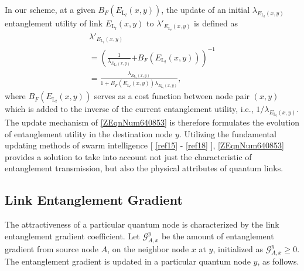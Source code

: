 \documentclass[11pt]{article}%
\newcommand*{\cref}[1]{%
  \begingroup
    \hypersetup{
      linkcolor=linkequation,
      linkbordercolor=linkequation,
    }%
    \ref{#1}%
  \endgroup
}
\begin{document}
 In our scheme, at a given $B_F\left(E_{{\mathrm{L}}_l}\left(x,y\right)\right)$, the update of an initial ${\lambda }_{E_{{\mathrm{L}}_l}\left(x,y\right)}$ entanglement utility of link $E_{{\mathrm{L}}_l}\left(x,y\right)$ to ${\lambda }'_{E_{{\mathrm{L}}_l}\left(x,y\right)}$ is defined as
\begin{equation} \label{ZEqnNum640853} 
 \begin{array}{l}
{\lambda }'_{E_{{\mathrm{L}}_l}\left(x,y\right)}\\\mathrm{=}{\left(\frac{\mathrm{1}}{{\lambda }_{E_{{\mathrm{L}}_l}\left(x,y\right)}}\mathrm{+}B_F\left(E_{{\mathrm{L}}_l}\left(x,y\right)\right)\right)}^{\mathrm{-}\mathrm{1}}\\\mathrm{=}\frac{{\lambda }_{E_{{\mathrm{L}}_l}\left(x,y\right)}}{\mathrm{1+}B_F\left(E_{{\mathrm{L}}_l}\left(x,y\right)\right){\lambda }_{E_{{\mathrm{L}}_l}\left(x,y\right)}}, \end{array}
\end{equation} 
where $B_F\left(E_{{\mathrm{L}}_l}\left(x,y\right)\right)$ serves as a cost function between node pair $\left(x,y\right)$ which is added to the inverse of the current entanglement utility, i.e., ${\mathrm{1}}/{{\lambda }_{E_{{\mathrm{L}}_l}\left(x,y\right)}}$. 
The update mechanism of \eqref{ZEqnNum640853} is therefore formulates the evolution of entanglement utility in the destination node $y$. Utilizing the fundamental updating methods of swarm intelligence [\cref{ref15}-\cref{ref18}], \eqref{ZEqnNum640853} provides a solution to take into account not just the characteristic of entanglement transmission, but also the physical attributes of quantum links.   
 
\subsection{Link Entanglement Gradient }
The attractiveness of a particular quantum node is characterized by the link entanglement gradient coefficient. Let ${\mathcal{G}}^y_{A,x}$ be the amount of entanglement gradient from source node $A$, on the neighbor node $x$ at $y$, initialized as ${\mathcal{G}}^y_{A,x}\mathrm{\ge }\mathrm{0}$. The entanglement gradient is updated in a particular quantum node $y$, as follows. 
\end{document}
